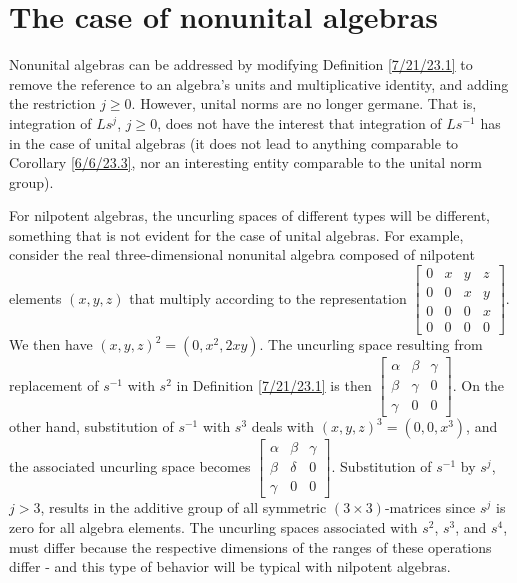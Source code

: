 \documentclass{amsart}
\numberwithin{equation}{section}
\theoremstyle{definition}
\numberwithin{theorem}{section}
\begin{document}
 \section{The case of nonunital algebras} Nonunital algebras can be addressed by modifying Definition \ref{7/21/23.1} to remove the reference to an algebra's units and multiplicative identity, and adding the restriction $j\ge 0$.   However, unital norms are no longer germane.  That is, integration of $Ls^j$, $j\ge 0$, does not have the interest that integration of $Ls^{-1}$ has in the case of unital algebras (it does not lead to anything comparable to Corollary \ref{6/6/23.3}, nor an interesting entity comparable to the unital norm group).

For nilpotent algebras, the uncurling spaces of different types will be different, something that is not evident for the case of unital algebras.  For example, consider the real three-dimensional nonunital algebra composed of nilpotent elements $(x,y,z)$ that multiply according to the representation
  $ \left[
\begin{array}{ccccc}
0 & x & y & z  \\
0 & 0 & x & y \\
0 & 0 & 0 & x \\
0 & 0 & 0 & 0
\end{array}
\right] $.  We then have $(x,y,z)^2 = (0,x^2, 2xy)$.  The uncurling space resulting from replacement of $s^{-1}$ with  $s^2$ in Definition \ref{7/21/23.1} is then $\left[
\begin{array}{ccccc}
\alpha & \beta & \gamma   \\
\beta & \gamma & 0 \\
\gamma & 0 & 0  
\end{array}
\right] $.  On the other hand, substitution of $s^{-1}$ with $s^3$  deals with $(x,y,z)^3 = (0,0, x^3)$, and the associated uncurling space becomes $\left[
\begin{array}{ccccc}
\alpha & \beta & \gamma   \\
\beta & \delta & 0 \\
\gamma & 0 & 0  
\end{array}
\right] $.  Substitution of $s^{-1}$ by $s^j$, $j>3$, results in the additive group of all symmetric $(3\times 3)$-matrices since $s^j$ is zero for all algebra elements.  The uncurling spaces associated with $s^2$, $s^3$, and $s^4$, must differ because the respective dimensions of the ranges of these operations differ - and this type of behavior will be typical with nilpotent algebras.  
 
\end{document}
